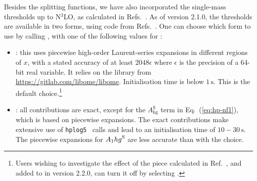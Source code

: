 Besides the splitting functions, we have also incorporated the
single-mass thresholds up to N$^3$LO, as calculated in
Refs.~\cite{Bierenbaum:2009mv,Ablinger:2010ty,Kawamura:2012cr,Blumlein:2012vq,ABLINGER2014263,Ablinger:2014nga,Ablinger:2014vwa,Behring:2014eya,Ablinger:2019etw,Behring:2021asx,Ablinger:2023ahe,Ablinger:2024xtt,Behring:2025avs}.
%
As of version 2.1.0, the \ntlo thresholds are available in two forms,
using code from Refs.~\cite{BlumleinCode,Fael:2022miw}.
%
One can choose which form to use by calling
,
with one of the following values for :
\begin{itemize}
\item {}:
  this uses piecewise high-order Laurent-series expansions in different
  regions of $x$, with a stated accuracy of at least $2048\epsilon$
  where $\epsilon$ is the precision of a 64-bit real variable.
  It relies on the
   \CPP library from \url{https://gitlab.com/libome/libome}.
  Initialisation time is below $1\,\text{s}$.
  This is the default choice.\footnote{Users wishing to investigate
    the effect of the  piece calculated in
    Ref.~\cite{Behring:2025avs}, and added to \hoppet in version 2.2.0, can turn it off by selecting
    .}
  
\item {}: all contributions are
  exact, except for the $A_\text{hg}^\text{S}$ term in
  Eq.~(\ref{eq:hp-nf1}), which is based on piecewise expansions.
  The exact contributions make extensive use of
  \texttt{hplog5}~\cite{FortranPolyLog} calls and lead to an
  initialisation time of $10{-}30\,\text{s}$.
  The piecewise expansions for $A_\text1{hg}^\text{S}$ are less
  accurate than with the  choice.
\end{itemize}

%   
% 

